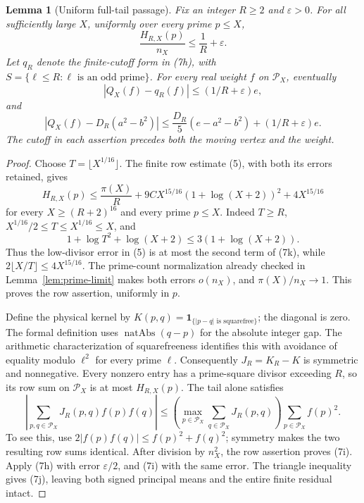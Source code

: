 \documentclass[11pt]{article}
\newtheorem{lemma}{Lemma}
\newcommand{\Pcal}{\mathcal P}
\begin{document}
\begin{lemma}[Uniform full-tail passage]\label{lem:full-tail}
Fix an integer \(R\ge2\) and \(\varepsilon>0\).
For all sufficiently large \(X\), uniformly over every prime \(p\le X\),
\[
 \frac{H_{R,X}(p)}{n_X}\le \frac1R+\varepsilon .
\]
Let \(q_R\) denote the finite-cutoff form in (7h), with
\(S=\{\ell\le R:\ell\text{ is an odd prime}\}\).
For every real weight \(f\) on \(\Pcal_X\), eventually
\[
 |Q_X(f)-q_R(f)|\le (1/R+\varepsilon)e,                    \tag{7i}
\]
and
\[
 |Q_X(f)-D_R(a^2-b^2)|
 \le \frac{D_R}{5}(e-a^2-b^2)+(1/R+\varepsilon)e.           \tag{7j}
\]
The cutoff in each assertion precedes both the moving vertex and the weight.
\end{lemma}
\begin{proof}
Choose \(T=\lfloor X^{1/16}\rfloor\).
The finite row estimate (5), with both its errors retained, gives
\[
 H_{R,X}(p)\le \frac{\pi(X)}R
   +9CX^{15/16}(1+\log(X+2))^2+4X^{15/16}                 \tag{7k}
\]
for every \(X\ge(R+2)^{16}\) and every prime \(p\le X\).
Indeed \(T\ge R\),
\(X^{1/16}/2\le T\le X^{1/16}\le X\), and
\[
 1+\log T^2+\log(X+2)\le3(1+\log(X+2)).
\]
Thus the low-divisor error in (5) is at most the second term of (7k),
while \(2\lfloor X/T\rfloor\le4X^{15/16}\).
The prime-count normalization already checked in
Lemma~\ref{lem:prime-limit} makes both errors \(o(n_X)\), and
\(\pi(X)/n_X\to1\). This proves the row assertion, uniformly in \(p\).

Define the physical kernel by
\(K(p,q)=\mathbf1_{\{\lvert p-q\rvert\text{ is squarefree}\}}\);
the diagonal is zero. The formal definition uses
\(\operatorname{natAbs}(q-p)\) for the absolute integer gap.
The arithmetic characterization of squarefreeness identifies this with
avoidance of equality modulo \(\ell^2\) for every prime \(\ell\).
Consequently \(J_R=K_R-K\) is symmetric and nonnegative.
Every nonzero entry has a prime-square divisor exceeding \(R\), so
its row sum on \(\Pcal_X\) is at most \(H_{R,X}(p)\).
The tail alone satisfies
\[
 \left|\sum_{p,q\in\Pcal_X}J_R(p,q)f(p)f(q)\right|
 \le \left(\max_{p\in\Pcal_X}\sum_{q\in\Pcal_X}J_R(p,q)\right)
      \sum_{p\in\Pcal_X}f(p)^2.
\]
To see this, use \(2|f(p)f(q)|\le f(p)^2+f(q)^2\);
symmetry makes the two resulting row sums identical.
After division by \(n_X^2\), the row assertion proves (7i).
Apply (7h) with error \(\varepsilon/2\), and (7i) with the same error.
The triangle inequality gives (7j), leaving both signed principal means
and the entire finite residual intact.
\end{proof}
\end{document}
